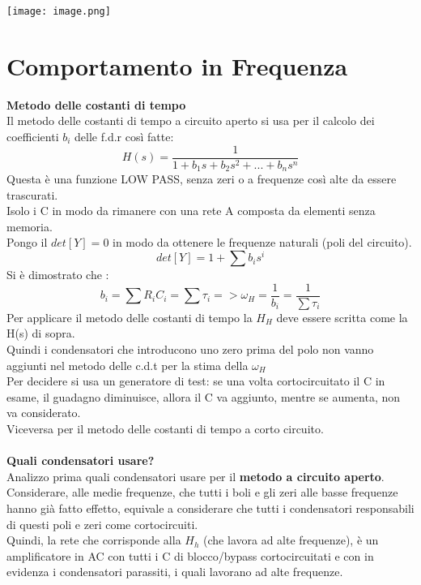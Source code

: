 \documentclass{article}
\begin{document}
\begin{center}
    \texttt{[image: image.png]}
\end{center}

\newpage

\section{Comportamento in Frequenza}

\textbf{Metodo delle costanti di tempo}\\
Il metodo delle costanti di tempo a circuito aperto si usa per il calcolo dei coefficienti $b_{i}$ delle f.d.r così fatte:
\begin{equation}
    H(s)=\frac{1}{1+b_{1}s+b_{2}s^2+...+b_{n}s^n}
\end{equation}
Questa è una funzione LOW PASS, senza zeri o a frequenze così alte da essere trascurati.\\
Isolo i C in modo da rimanere con una rete A composta da elementi senza memoria.\\
Pongo il $det[Y]=0$ in modo da ottenere le frequenze naturali (poli del circuito).
\begin{equation}
    det[Y]=1+\sum b_{i}s^i
\end{equation}
Si è dimostrato che :
\begin{equation}
    b_{i}=\sum R_{i}C_{i} = \sum \tau_{i} => \omega_{H}=\frac{1}{b_{i}}=\frac{1}{\sum \tau_{i}}
\end{equation}
Per applicare il metodo delle costanti di tempo la $H_{H}$ deve essere scritta come la H(s) di sopra.\\
Quindi i condensatori che introducono uno zero prima del polo non vanno aggiunti nel metodo delle c.d.t per la stima della $\omega_{H}$\\
Per decidere si usa un generatore di test: se una volta cortocircuitato il C in esame, il guadagno diminuisce, allora il C va aggiunto, mentre se aumenta, non va considerato.\\
Viceversa per il metodo delle costanti di tempo a corto circuito.\\\\
\textbf{Quali condensatori usare?} \\
Analizzo prima quali condensatori usare per il \textbf{metodo a circuito aperto}.\\
Considerare, alle medie frequenze, che tutti i boli e gli zeri alle basse frequenze hanno già fatto effetto, equivale a considerare che tutti i condensatori responsabili di questi poli e zeri come cortocircuiti. \\ Quindi, la rete che corrisponde alla $ H_{h} $ (che lavora ad alte frequenze), è un amplificatore in AC con tutti i C di blocco/bypass cortocircuitati e con in evidenza i condensatori parassiti, i quali lavorano ad alte frequenze. \\
\end{document}

